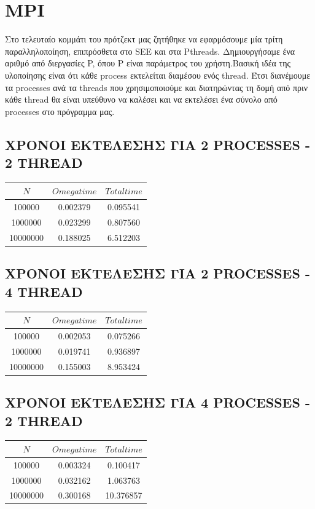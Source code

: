 \documentclass{FR16}
\begin{document}
\section{MPI}
Στο τελευταίο κομμάτι του πρότζεκτ μας ζητήθηκε να εφαρμόσουμε μία τρίτη παραλληλοποίηση, επιπρόσθετα στο SEE και στα Pthreads. Δημιουργήσαμε ένα αριθμό από διεργασίες P, όπου P είναι παράμετρος του χρήστη.Βασική ιδέα της υλοποίησης είναι ότι κάθε process εκτελείται διαμέσου ενός thread. Έτσι διανέμουμε τα processes ανά τα threads που χρησιμοποιούμε και διατηρώντας τη δομή από πριν κάθε thread θα είναι υπεύθυνο να καλέσει και να εκτελέσει ένα σύνολο από processes στο πρόγραμμα μας.

\subsection{ΧΡΟΝΟΙ ΕΚΤΕΛΕΣΗΣ ΓΙΑ 2 PROCESSES - 2 THREAD}
\begin{center}
\begin{tabular}{c c c}
\arrayrulecolor{Azzurro}
\hline
{\bfseries $Ν$} & {\bfseries $Omega time$} & {\bfseries $Total time$}\\
\hline
100000 & 0.002379 & 0.095541 \\
1000000 & 0.023299 & 0.807560 \\
10000000 & 0.188025 & 6.512203 \\
\hline
\end{tabular}
\end{center}

\subsection{ΧΡΟΝΟΙ ΕΚΤΕΛΕΣΗΣ ΓΙΑ 2 PROCESSES - 4 THREAD}
\begin{center}
\begin{tabular}{c c c}
\arrayrulecolor{Azzurro}
\hline
{\bfseries $Ν$} & {\bfseries $Omega time$} & {\bfseries $Total time$}\\
\hline
100000 & 0.002053 & 0.075266 \\
1000000 & 0.019741 & 0.936897 \\
10000000 & 0.155003 & 8.953424 \\
\hline
\end{tabular}
\end{center}

\subsection{ΧΡΟΝΟΙ ΕΚΤΕΛΕΣΗΣ ΓΙΑ 4 PROCESSES - 2 THREAD}
\begin{center}
\begin{tabular}{c c c}
\arrayrulecolor{Azzurro}
\hline
{\bfseries $Ν$} & {\bfseries $Omega time$} & {\bfseries $Total time$}\\
\hline
100000 & 0.003324 & 0.100417 \\
1000000 & 0.032162 & 1.063763 \\
10000000 & 0.300168 & 10.376857 \\
\hline
\end{tabular}
\end{center}
\end{document}
